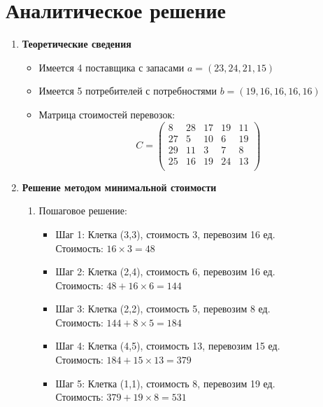 \documentclass{report}
\begin{document}
	\chapter{Аналитическое решение}
\begin{enumerate}
	\item \textbf{Теоретические сведения}
	
	\begin{itemize}
		\item Имеется 4 поставщика с запасами $a = (23, 24, 21, 15)$
		\item Имеется 5 потребителей с потребностями $b = (19, 16, 16, 16, 16)$
		\item Матрица стоимостей перевозок:
		\[
		C = \begin{pmatrix}
			8 & 28 & 17 & 19 & 11 \\
			27 & 5 & 10 & 6 & 19 \\
			29 & 11 & 3 & 7 & 8 \\
			25 & 16 & 19 & 24 & 13 \\
		\end{pmatrix}
		\]
	\end{itemize}
	
	\item \textbf{Решение методом минимальной стоимости}
	
	\begin{enumerate}
		\item Пошаговое решение:
		
		\begin{itemize}
			\item Шаг 1: Клетка (3,3), стоимость 3, перевозим 16 ед. \\
			Стоимость: $16 \times 3 = 48$
			
			\item Шаг 2: Клетка (2,4), стоимость 6, перевозим 16 ед. \\
			Стоимость: $48 + 16 \times 6 = 144$
			
			\item Шаг 3: Клетка (2,2), стоимость 5, перевозим 8 ед. \\
			Стоимость: $144 + 8 \times 5 = 184$
			
			\item Шаг 4: Клетка (4,5), стоимость 13, перевозим 15 ед. \\
			Стоимость: $184 + 15 \times 13 = 379$
			
			\item Шаг 5: Клетка (1,1), стоимость 8, перевозим 19 ед. \\
			Стоимость: $379 + 19 \times 8 = 531$
			

\end{itemize}
\end{enumerate}
\end{enumerate}
\end{document}
